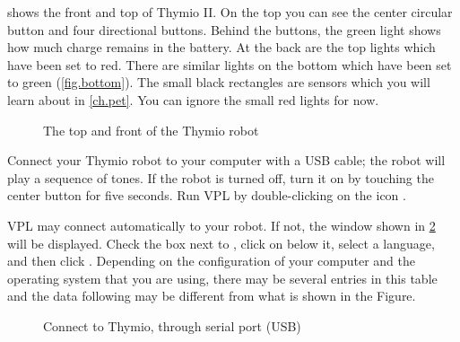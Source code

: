 


 shows the front and top of Thymio II. On the
top you can see the center circular button and four directional buttons.
Behind the buttons, the green light shows how much charge remains in the
battery. At the back are the top lights which have been set to red.
There are similar lights on the bottom which have been set to green
(\cref{fig.bottom}). The small black rectangles are sensors which
you will learn about in \cref{ch.pet}. You can ignore the small
red lights for now.

\begin{figure}[h]
\begin{center}
\caption{The top and front of the Thymio robot}\label{fig.front}
\end{center}
\end{figure}

\pagebreak


Connect your Thymio robot to your computer with a USB cable; the robot will play a sequence of tones.
If the robot is turned off, turn it on by touching the center
button for five seconds. Run VPL by double-clicking on the icon
.


VPL may connect automatically to your robot.
If not, the window shown in \cref{fig.connect} will be
displayed. Check the box next to , click on  below it, select a language, and then click
.
Depending on the configuration of your computer
and the operating system that you are using, there may be several
entries in this table and the data following  may be
different from what is shown in the Figure.


\begin{figure}
\begin{center}
\caption{Connect to Thymio, through serial port (USB)}\label{fig.connect}
\end{center}
\end{figure}

